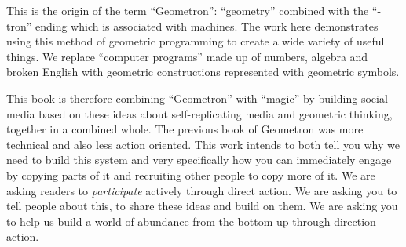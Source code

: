 This is the origin of the term ``Geometron'': ``geometry'' combined with
the ``-tron'' ending which is associated with machines. The work here
demonstrates using this method of geometric programming to create a wide
variety of useful things. We replace ``computer programs'' made up of
numbers, algebra and broken English with geometric constructions
represented with geometric symbols.

This book is therefore combining ``Geometron'' with ``magic'' by
building social media based on these ideas about self-replicating media
and geometric thinking, together in a combined whole. The previous book
of Geometron was more technical and also less action oriented. This work
intends to both tell you why we need to build this system and very
specifically how you can immediately engage by copying parts of it and
recruiting other people to copy more of it. We are asking readers to
\emph{participate} actively through direct action. We are asking you to
tell people about this, to share these ideas and build on them. We are
asking you to help us build a world of abundance from the bottom up
through direction action.

